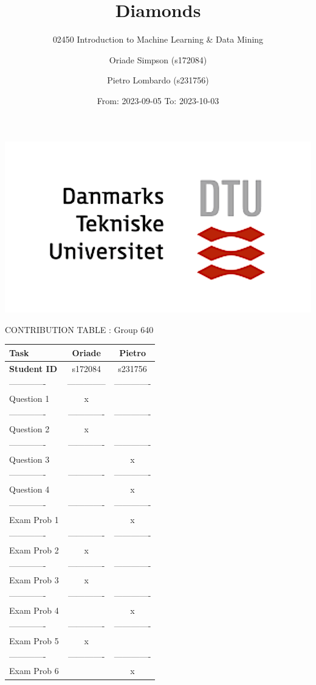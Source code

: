 \documentclass[
]{article}
\title{Diamonds}
\subtitle{02450 Introduction to Machine Learning \& Data Mining}
\author{Oriade Simpson (s172084) \and Pietro Lombardo (s231756)}
\date{From: 2023-09-05 To: 2023-10-03}
\begin{document}
\maketitle

\begin{center}\includegraphics[width=0.4\linewidth]{Images/Universe2} \end{center}

\begin{center}
CONTRIBUTION TABLE : Group 640
\end{center}

\begin{longtable}[]{@{}lcc@{}}
\toprule\noalign{}
Task & Oriade & Pietro \\
\midrule\noalign{}
\endhead
\bottomrule\noalign{}
\endlastfoot
\textbf{Student ID} & s172084 & s231756 \\
------------- & -------------- & ------------- \\
Question 1 & x & \\
------------- & ------------- & ------------- \\
Question 2 & x & \\
------------- & ------------- & ------------- \\
Question 3 & & x \\
------------- & ------------- & ------------- \\
Question 4 & & x \\
------------- & ------------- & ------------- \\
Exam Prob 1 & & x \\
------------- & ------------- & ------------- \\
Exam Prob 2 & x & \\
------------- & ------------- & ------------- \\
Exam Prob 3 & x & \\
------------- & ------------- & ------------- \\
Exam Prob 4 & & x \\
------------- & ------------- & ------------- \\
Exam Prob 5 & x & \\
------------- & ------------- & ------------- \\
Exam Prob 6 & & x \\
\end{longtable}
\end{document}
